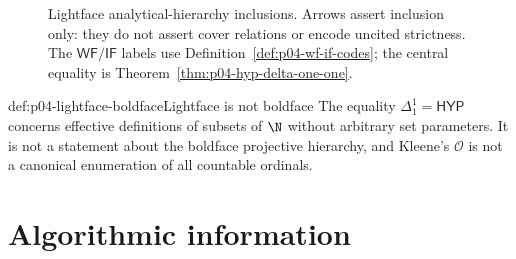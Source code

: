 \begin{figure}[htbp]
\centering
{}
\caption{Lightface analytical-hierarchy inclusions.
Arrows assert inclusion only: they do not assert cover relations or encode
uncited strictness.  The \(\mathsf{WF}/\mathsf{IF}\) labels use
Definition~\ref{def:p04-wf-if-codes}; the central equality is
Theorem~\ref{thm:p04-hyp-delta-one-one}.}
\label{fig:p04-analytical-hierarchy}
\end{figure}

\begin{hbwarning}{def:p04-lightface-boldface}{Lightface is not boldface}
The equality \(\Delta^1_1=\mathsf{HYP}\) concerns effective definitions of
subsets of \(\N\) without arbitrary set parameters.  It is not a statement
about the boldface projective hierarchy, and Kleene's \(\mathcal O\) is not a
canonical enumeration of all countable ordinals.
\end{hbwarning}

\section{Algorithmic information}
\label{sec:p04-kolmogorov-complexity}


